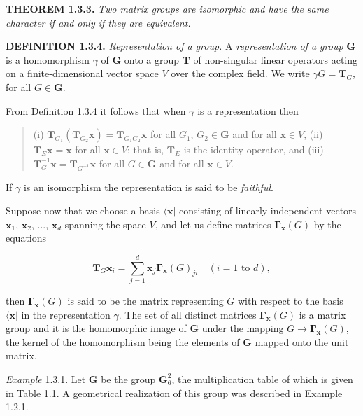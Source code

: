 \documentclass[11pt,a4paper,twoside,openright]{book}
\begin{document}
\textbf{THEOREM 1.3.3.} \textit{Two matrix groups are isomorphic and have the same character if and only if they are equivalent.}

\textbf{DEFINITION 1.3.4.} \textit{Representation of a group.} A \textit{representation of a group} $\mathbf{G}$ is a homomorphism $\gamma$ of $\mathbf{G}$ onto a group $\mathbf{T}$ of non-singular linear operators acting on a finite-dimensional vector space $V$ over the complex field. We write $\gamma G = \mathbf{T}_{G}$, for all $G \in \mathbf{G}$.

From Definition 1.3.4 it follows that when $\gamma$ is a representation then

\begin{quote}(i) $\mathbf{T}_{G_{1}}(\mathbf{T}_{G_{2}}\mathbf{x}) = \mathbf{T}_{G_{1}G_{2}}\mathbf{x}$ for all $G_{1}$, $G_{2} \in \mathbf{G}$ and for all $\mathbf{x} \in V$, (ii) $\mathbf{T}_{E}\mathbf{x} = \mathbf{x}$ for all $\mathbf{x} \in V$; that is, $\mathbf{T}_{E}$ is the identity operator, and (iii) $\mathbf{T}_{G}^{-1}\mathbf{x} = \mathbf{T}_{G^{-1}}\mathbf{x}$ for all $G \in \mathbf{G}$ and for all $\mathbf{x} \in V$.\end{quote}

If $\gamma$ is an isomorphism the representation is said to be \textit{faithful}.

Suppose now that we choose a basis $\langle \mathbf{x}|$ consisting of linearly independent vectors $\mathbf{x}_{1}$, $\mathbf{x}_{2}$, ..., $\mathbf{x}_{d}$ spanning the space $V$, and let us define matrices $\boldsymbol{\Gamma}_{\mathbf{x}}(G)$ by the equations

\begin{equation*}
\mathbf{T}_{G}\mathbf{x}_{i} = \sum_{j=1}^{d} \mathbf{x}_{j}\boldsymbol{\Gamma}_{\mathbf{x}}(G)_{ji} \quad (i = 1 \text{ to } d), \tag{1.3.1}
\end{equation*}

then $\boldsymbol{\Gamma}_{\mathbf{x}}(G)$ is said to be the matrix representing $G$ with respect to the basis $\langle \mathbf{x}|$ in the representation $\gamma$. The set of all distinct matrices $\boldsymbol{\Gamma}_{\mathbf{x}}(G)$ is a matrix group and it is the homomorphic image of $\mathbf{G}$ under the mapping $G \rightarrow \boldsymbol{\Gamma}_{\mathbf{x}}(G)$, the kernel of the homomorphism being the elements of $\mathbf{G}$ mapped onto the unit matrix.

\textit{Example} 1.3.1. Let $\mathbf{G}$ be the group $\mathbf{G}_6^2$, the multiplication table of which is given in Table 1.1. A geometrical realization of this group was described in Example 1.2.1.
\end{document}

